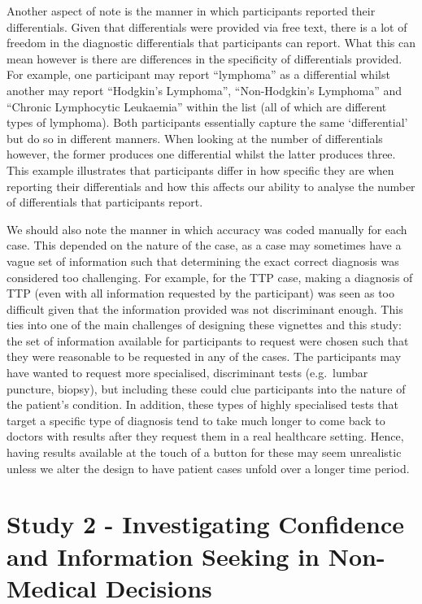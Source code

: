 \documentclass[a4paper, nobind]{templates/ociamthesis}
\begin{document}
Another aspect of note is the manner in which participants reported their differentials. Given that differentials were provided via free text, there is a lot of freedom in the diagnostic differentials that participants can report. What this can mean however is there are differences in the specificity of differentials provided. For example, one participant may report ``lymphoma'' as a differential whilst another may report ``Hodgkin's Lymphoma'', ``Non-Hodgkin's Lymphoma'' and ``Chronic Lymphocytic Leukaemia'' within the list (all of which are different types of lymphoma). Both participants essentially capture the same `differential' but do so in different manners. When looking at the number of differentials however, the former produces one differential whilst the latter produces three. This example illustrates that participants differ in how specific they are when reporting their differentials and how this affects our ability to analyse the number of differentials that participants report.

We should also note the manner in which accuracy was coded manually for each case. This depended on the nature of the case, as a case may sometimes have a vague set of information such that determining the exact correct diagnosis was considered too challenging. For example, for the TTP case, making a diagnosis of TTP (even with all information requested by the participant) was seen as too difficult given that the information provided was not discriminant enough. This ties into one of the main challenges of designing these vignettes and this study: the set of information available for participants to request were chosen such that they were reasonable to be requested in any of the cases. The participants may have wanted to request more specialised, discriminant tests (e.g.~lumbar puncture, biopsy), but including these could clue participants into the nature of the patient's condition. In addition, these types of highly specialised tests that target a specific type of diagnosis tend to take much longer to come back to doctors with results after they request them in a real healthcare setting. Hence, having results available at the touch of a button for these may seem unrealistic unless we alter the design to have patient cases unfold over a longer time period.

\hypertarget{study-2---investigating-confidence-and-information-seeking-in-non-medical-decisions}{%
\chapter*{Study 2 - Investigating Confidence and Information Seeking in Non-Medical Decisions}\label{study-2---investigating-confidence-and-information-seeking-in-non-medical-decisions}}
\end{document}
